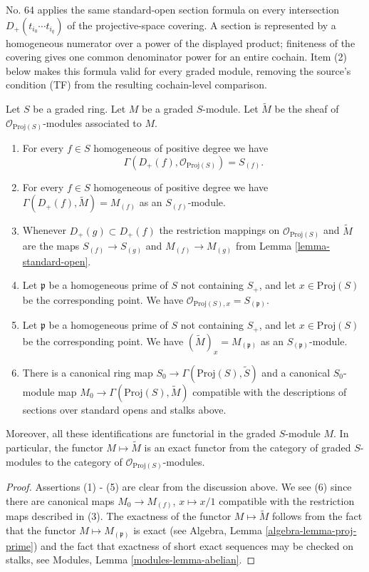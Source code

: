 \begin{lemma}
\begin{history}
No. 64 applies the same standard-open section formula on every intersection
$D_+(t_{i_0}\cdots t_{i_q})$ of the projective-space covering. A section is
represented by a homogeneous numerator over a power of the displayed
product; finiteness of the covering gives one common denominator power for
an entire cochain. Item (2) below makes this formula valid for every graded
module, removing the source's condition (TF) from the resulting cochain-level
comparison.
\end{history}
Let $S$ be a graded ring. Let $M$ be a graded $S$-module.
Let $\widetilde M$ be the sheaf of $\mathcal{O}_{\text{Proj}(S)}$-modules
associated to $M$.
\begin{enumerate}
\item For every $f \in S$ homogeneous of positive degree we have
$$
\Gamma(D_{+}(f), \mathcal{O}_{\text{Proj}(S)}) = S_{(f)}.
$$
\item For every $f\in S$ homogeneous of positive degree
we have $\Gamma(D_{+}(f), \widetilde M) = M_{(f)}$
as an $S_{(f)}$-module.
\item Whenever $D_{+}(g) \subset D_{+}(f)$ the restriction mappings
on $\mathcal{O}_{\text{Proj}(S)}$ and $\widetilde M$
are the maps
$S_{(f)} \to S_{(g)}$ and $M_{(f)} \to M_{(g)}$ from Lemma
\ref{lemma-standard-open}.
\item Let $\mathfrak p$ be a homogeneous prime of $S$ not containing
$S_{+}$, and let $x \in \text{Proj}(S)$
be the corresponding point. We have
$\mathcal{O}_{\text{Proj}(S), x} = S_{(\mathfrak p)}$.
\item Let $\mathfrak p$ be a homogeneous prime of $S$ not containing
$S_{+}$, and let $x \in \text{Proj}(S)$
be the corresponding point. We have $(\widetilde M)_x = M_{(\mathfrak p)}$
as an $S_{(\mathfrak p)}$-module.
\item
\label{item-map}
There is a canonical ring map
$
S_0 \longrightarrow \Gamma(\text{Proj}(S), \widetilde S)
$
and a canonical $S_0$-module map
$
M_0 \longrightarrow \Gamma(\text{Proj}(S), \widetilde M)
$
compatible with the descriptions of sections over standard opens
and stalks above.
\end{enumerate}
Moreover, all these identifications are functorial in the graded
$S$-module $M$. In particular, the functor $M \mapsto \widetilde M$
is an exact functor from the category of graded $S$-modules
to the category of $\mathcal{O}_{\text{Proj}(S)}$-modules.
\end{lemma}

\begin{proof}
Assertions (1) - (5) are clear from the discussion above.
We see (6) since there are canonical maps $M_0 \to M_{(f)}$,
$x \mapsto x/1$ compatible with the restriction maps
described in (3). The exactness of the functor $M \mapsto \widetilde M$
follows from the fact that the functor $M \mapsto M_{(\mathfrak p)}$
is exact (see Algebra, Lemma \ref{algebra-lemma-proj-prime})
and the fact that exactness of short exact sequences
may be checked on stalks, see
Modules, Lemma \ref{modules-lemma-abelian}.
\end{proof}

